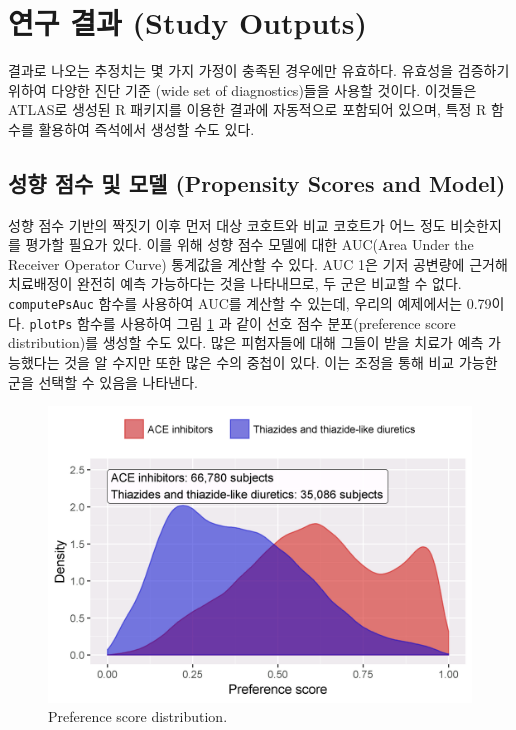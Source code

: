 \documentclass[11pt]{book}
\theoremstyle{definition}
\theoremstyle{definition}
\theoremstyle{definition}
\theoremstyle{remark}
\begin{document}
\section{연구 결과 (Study Outputs)}\label{studyOutputs}

결과로 나오는 추정치는 몇 가지 가정이 충족된 경우에만 유효하다. 유효성을
검증하기 위하여 다양한 진단 기준 (wide set of diagnostics)들을 사용할
것이다. 이것들은 ATLAS로 생성된 R 패키지를 이용한 결과에 자동적으로
포함되어 있으며, 특정 R 함수를 활용하여 즉석에서 생성할 수도 있다.

\subsection{성향 점수 및 모델 (Propensity Scores and
Model)}\label{----propensity-scores-and-model}

성향 점수 기반의 짝짓기 이후 먼저 대상 코호트와 비교 코호트가 어느 정도
비슷한지를 평가할 필요가 있다. 이를 위해 성향 점수 모델에 대한 AUC(Area
Under the Receiver Operator Curve) 통계값을 계산할 수 있다. AUC 1은 기저
공변량에 근거해 치료배정이 완전히 예측 가능하다는 것을 나타내므로, 두
군은 비교할 수 없다. \texttt{computePsAuc} 함수를 사용하여 AUC를 계산할
수 있는데, 우리의 예제에서는 0.79이다. \texttt{plotPs} 함수를 사용하여
그림 \ref{fig:ps} 과 같이 선호 점수 분포(preference score
distribution)를 생성할 수도 있다. 많은 피험자들에 대해 그들이 받을
치료가 예측 가능했다는 것을 알 수지만 또한 많은 수의 중첩이 있다. 이는
조정을 통해 비교 가능한 군을 선택할 수 있음을 나타낸다.

\begin{figure}

{\centering \includegraphics[width=0.8\linewidth]{images/PopulationLevelEstimation/ps} 

}

\caption{Preference score distribution.}\label{fig:ps}
\end{figure}
\end{document}
